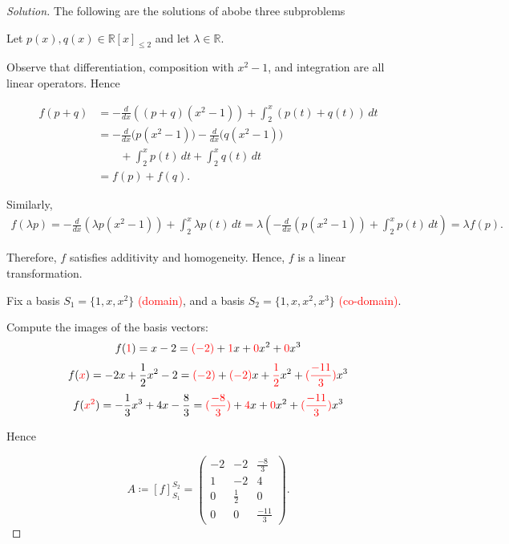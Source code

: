 \documentclass[12pt]{article}
\newenvironment{solution}
{\begin{proof}[Solution]}
{\end{proof}}
\begin{document}
\begin{solution}{
The following are the solutions of abobe three subproblems

\medskip


Let $p(x),q(x)\in\mathbb{R}[x]_{\le2}$ and let $\lambda\in\mathbb{R}$.

Observe that differentiation, composition with $x^2-1$, and integration
are all linear operators. Hence

\begin{align*}
f(p+q)
&=
-\frac{d}{dx}\!\left((p+q)(x^2-1)\right)
+\int_2^x(p(t)+q(t))\,dt      \\
&=
-\frac{d}{dx}\bigl(p(x^2-1)\bigr)
-\frac{d}{dx}\bigl(q(x^2-1)\bigr)\\
&\qquad
+\int_2^xp(t)\,dt
+\int_2^xq(t)\,dt             \\
&=
f(p)+f(q).
\end{align*}

Similarly,
\begin{align*}
f(\lambda p)=-\frac{d}{dx}\!\left(\lambda p(x^2-1)\right)+\int_2^x\lambda p(t)\,dt
=
\lambda
\left(
-\frac{d}{dx}(p(x^2-1))
+\int_2^xp(t)\,dt
\right)
=
\lambda f(p).
\end{align*}

Therefore, $f$ satisfies additivity and homogeneity. Hence,
$f$ is a linear transformation.
}

\medskip


Fix a basis $S_1=\{1,x,x^2\}$ \textcolor{red}{(domain)}, and a basis $S_2=\{1,x,x^2,x^3\}$ \textcolor{red}{(co-domain)}.

Compute the images of the basis vectors:
\[
f(\textcolor{red}{1})=x-2 = \textcolor{red}{(-2)} + \textcolor{red}{1}x + \textcolor{red}{0}x^2 + \textcolor{red}{0}x^3
\]
\[
f(\textcolor{red}{x})=-2x+\frac12x^2-2 =\textcolor{red}{(-2)} + \textcolor{red}{(-2)}x + \textcolor{red}{\frac12}x^2 + \textcolor{red}{(\frac{-11}{3})}x^3
\]
\[
f(\textcolor{red}{x^2})=-\frac13x^3+4x-\frac83 = \textcolor{red}{(\frac{-8}{3})} + \textcolor{red}{4}x + \textcolor{red}{0}x^2 + \textcolor{red}{(\frac{-11}{3})}x^3
\]

Hence

\[
A \coloneq [f]_{S_1}^{S_2}=
\begin{pmatrix}
-2&-2&\frac{-8}3\\
1&-2&4\\
0&\frac12&0\\
0&0&\frac{-11}3
\end{pmatrix}.
\]


\end{solution}
\end{document}
